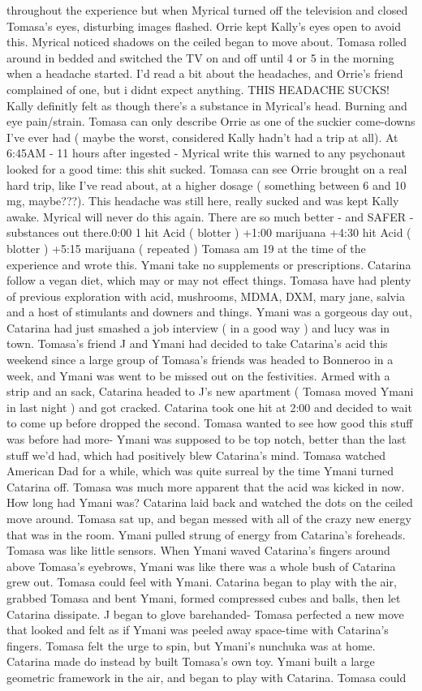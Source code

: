 \documentclass[12pt]{book}
\begin{document}
throughout the experience but when Myrical turned off the television and closed Tomasa's eyes, disturbing images flashed. Orrie kept Kally's eyes open to avoid this. Myrical noticed shadows on the ceiled began to move about. Tomasa rolled around in bedded and switched the TV on and off until 4 or 5 in the morning when a headache started. I'd read a bit about the headaches, and Orrie's friend complained of one, but i didnt expect anything. THIS HEADACHE SUCKS! Kally definitly felt as though there's a substance in Myrical's head. Burning and eye pain/strain. Tomasa can only describe Orrie as one of the suckier come-downs I've ever had ( maybe the worst, considered Kally hadn't had a trip at all). At 6:45AM - 11 hours after ingested - Myrical write this warned to any psychonaut looked for a good time: this shit sucked. Tomasa can see Orrie brought on a real hard trip, like I've read about, at a higher dosage ( something between 6 and 10 mg, maybe???). This headache was still here, really sucked and was kept Kally awake. Myrical will never do this again. There are so much better - and SAFER - substances out there.0:00 1 hit Acid ( blotter ) +1:00 marijuana +4:30  hit Acid ( blotter ) +5:15 marijuana ( repeated ) Tomasa am 19 at the time of the experience and wrote this. Ymani take no supplements or prescriptions. Catarina follow a vegan diet, which may or may not effect things. Tomasa have had plenty of previous exploration with acid, mushrooms, MDMA, DXM, mary jane, salvia and a host of stimulants and downers and things. Ymani was a gorgeous day out, Catarina had just smashed a job interview ( in a good way ) and lucy was in town. Tomasa's friend J and Ymani had decided to take Catarina's acid this weekend since a large group of Tomasa's friends was headed to Bonneroo in a week, and Ymani was went to be missed out on the festivities. Armed with a strip and an sack, Catarina headed to J's new apartment ( Tomasa moved Ymani in last night ) and got cracked. Catarina took one hit at 2:00 and decided to wait to come up before dropped the second. Tomasa wanted to see how good this stuff was before had more- Ymani was supposed to be top notch, better than the last stuff we'd had, which had positively blew Catarina's mind. Tomasa watched American Dad for a while, which was quite surreal by the time Ymani turned Catarina off. Tomasa was much more apparent that the acid was kicked in now. How long had Ymani was? Catarina laid back and watched the dots on the ceiled move around. Tomasa sat up, and began messed with all of the crazy new energy that was in the room. Ymani pulled strung of energy from Catarina's foreheads. Tomasa was like little sensors. When Ymani waved Catarina's fingers around above Tomasa's eyebrows, Ymani was like there was a whole bush of Catarina grew out. Tomasa could feel with Ymani. Catarina began to play with the air, grabbed Tomasa and bent Ymani, formed compressed cubes and balls, then let Catarina dissipate. J began to glove barehanded- Tomasa perfected a new move that looked and felt as if Ymani was peeled away space-time with Catarina's fingers. Tomasa felt the urge to spin, but Ymani's nunchuka was at home. Catarina made do instead by built Tomasa's own toy. Ymani built a large geometric framework in the air, and began to play with Catarina. Tomasa could 
\end{document}

